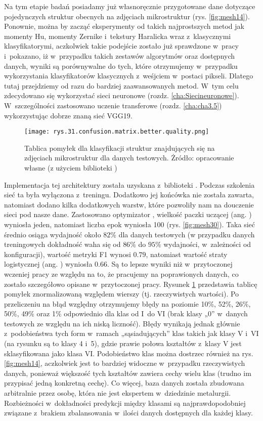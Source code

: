 Na tym etapie badań posiadamy już własnoręcznie przygotowane dane dotyczące pojedynczych struktur obecnych na zdjęciach mikrostruktur (rys. \ref{fig:mesh14}). Ponownie, można by zacząć eksperymenty od takich najprostszych metod jak momenty Hu, momenty Zernike i~tekstury Haralicka wraz z~klasycznymi klasyfikatorymi, aczkolwiek takie podejście zostało już sprawdzone w~pracy \cite{Reczek21} i~pokazano, iż w~przypadku takich zestawów algorytmów oraz dostępnych danych, wyniki są porównywalne do tych, które otrzymujemy w~przypadku wykorzystania klasyfikatorów klasycznych z~weśjciem w~postaci pikseli. Dlatego tutaj przejdziemy od razu do bardziej zaawansowanych metod. W~tym celu zdecydowano się wykorzystać sieci neuronowe (rozdz. \ref{cha:Siecineuronowe}). W~szczególności zastosowano uczenie transferowe (rozdz. \ref{cha:cha3.5}) wykorzystując dobrze znaną sieć VGG19. 
\begin{figure}[h]
    \centering
    \texttt{[image: rys.31.confusion.matrix.better.quality.png]}  %
    \caption{Tablica pomyłek dla klasyfikacji struktur znajdujących się na zdjęciach mikrostruktur dla danych testowych. Żródło: opracowanie własne (z użyciem biblioteki )}
    \label{fig:mesh29}
\end{figure}
Implementacja tej architektury została uzyskana z~biblioteki . Podczas szkolenia sieć ta była wyłączona z~treningu. Dodatkowo jej końcówka nie została zawarta, natomiast dodano kilka dodatkowych warstw, które pozwoliły nam na douczenie sieci pod nasze dane. Zastosowano optymizator , wielkość paczki uczącej (ang. ) wyniosła jeden, natomiast liczba epok wyniosła 100 (rys. \ref{fig:mesh30}).  Taka sieć średnio osiąga wydajność około $82\%$ dla danych testowych (w przypadku danych treningowych dokładność waha się od $86\%$ do $95\%$ wydajności, w~zależności od konfiguracji), wartość metryki F1 wynosi $0.79$, natomiast wartość straty logistycznej (ang. ) wyniosła $0.66$. Są to lepsze wyniki niż w~przytoczonej wczeniej pracy \cite{Reczek21} ze względu na to, że pracujemy na poprawionych danych, co zostało szczegółowo opisane w~przytoczonej pracy. Rysunek \ref{fig:mesh29} przedstawia tablicę pomyłek znormalizowaną względem wierszy (tj. rzeczywistych wartości). 
Po przeliczeniu na błąd względny otrzymujemy błędy na poziomie 10\%, 52\%, 26\%, 50\%, 49\% oraz 1\% odpowiednio dla klas od I~do VI (brak klasy „0” w~danych testowych ze względu na ich niską liczność). Błędy wynikają jednak głównie z~podobieństwa tych form w~ramach „sąsiadujących” klas takich jak klasy V i~VI (na rysunku są to klasy 4 i~5), gdzie prawie połowa kształtów z~klasy V jest sklasyfikowana jako klasa VI. Podobieństwo klas można dostrzec również na rys. \ref{fig:mesh14}, aczkolwiek jest to bardziej widoczne w~przypadku rzeczywistych danych, ponieważ większość tych kształtów zawiera cechy wielu klas (trudno im przypisać jedną konkretną cechę). Co więcej, baza danych została zbudowana arbitralnie przez osobę, która nie jest ekspertem w~dziedzinie metalurgii. Rozbieżności w~dokładności predykcji między klasami są najprawdopodobniej związane z~brakiem zbalansowania w~ilości danych dostępnych dla każdej klasy.
